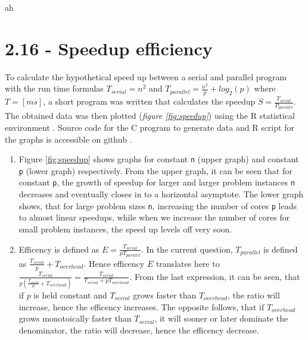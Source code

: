 \documentclass[a4paper,11pt,twoside]{article}
\begin{document}
    
ah\section{2.16 - Speedup efficiency}
To calculate the hypothetical speed up between a serial and parallel program with the run time formulas $T_{serial}=n^{2}$ and $T_{parallel} = \frac{n^{2}}{p}+log_{2}(p)$ where $T=[ms]$, a short program was written that calculates the speedup $S=\frac{T_{serial}}{P_{parallel}}$. The obtained data was then plotted (\textit{figure \ref{fig:speedup}}) using the R statistical environment \cite{rlanguage}. Source code for the C program to generate data and R script for the graphs is accessible on github \cite{github}. 
 
\begin{enumerate}[label={\alph*)}]
\item Figure \ref{fig:speedup} shows graphs for constant \verb+n+ (upper graph) and constant \verb+p+ (lower graph) respectively. From the upper graph, it can be seen that for constant \verb+p+, the growth of speedup for larger and larger problem instances \verb+n+ decreases and eventually closes in to a horizontal asymptote. The lower graph shows, that for large problem sizes \verb+n+, increasing the number of cores \verb+p+ leads to almost linear speedups, while when we increase the number of cores for small problem instances, the speed up levels off very soon.    

\item Efficency is defined as $E = \frac{T_{serial}}{pT_{parallel}}$. In the current question, $T_{parallel}$ is defined as $\frac{T_{serial}}{p}+T_{overhead}$. Hence efficency $E$ translates here to $\frac{T_{serial}}{p(\frac{T_{serial}}{p}+T_{overhead})} = \frac{T_{serial}}{T_{serial}+pT_{overhead}}$. From the last expression, it can be seen, that if $p$ is held constant and $T_{serial}$ grows faster than $T_{overhead}$, the ratio will increase, hence the efficency increases.
The opposite follows, that if $T_{overhead}$ grows monotoically faster than $T_{serial}$, it will sooner or later dominate the denominator, the ratio will decrease, hence the efficency decrease.
  
\end{enumerate}
\end{document}
